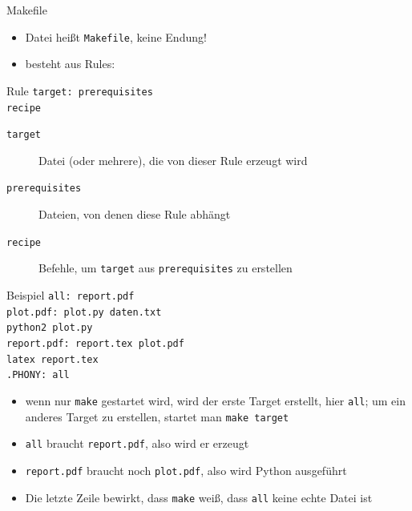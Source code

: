 \begin{frame}{Makefile}
  \begin{itemize}
    \item Datei heißt \texttt{Makefile}, keine Endung!
    \item besteht aus Rules:
  \end{itemize}
  \begin{block}{Rule}
    \texttt{target: prerequisites\\
    \hspace{1cm} recipe}
  \end{block}
  \begin{description}
    \item[\texttt{target}] Datei (oder mehrere), die von dieser Rule erzeugt wird
    \item[\texttt{prerequisites}] Dateien, von denen diese Rule abhängt
    \item[\texttt{recipe}] Befehle, um \texttt{target} aus \texttt{prerequisites} zu erstellen
  \end{description}
\end{frame}

\begin{frame}{Beispiel}
  \texttt{all: report.pdf\\[0.5cm]
    plot.pdf: plot.py daten.txt\\
    \hspace{1cm} python2 plot.py\\[0.5cm]
    report.pdf: report.tex plot.pdf\\
    \hspace{1cm} latex report.tex\\[0.5cm]
    .PHONY: all
  }

  \begin{itemize}
    \item wenn nur \texttt{make} gestartet wird, wird der erste Target erstellt, hier \texttt{all}; um ein anderes Target zu erstellen, startet man \texttt{make target}
    \item \texttt{all} braucht \texttt{report.pdf}, also wird er erzeugt
    \item \texttt{report.pdf} braucht noch \texttt{plot.pdf}, also wird Python ausgeführt
    \item Die letzte Zeile bewirkt, dass \texttt{make} weiß, dass \texttt{all} keine echte Datei ist
  \end{itemize}
\end{frame}

